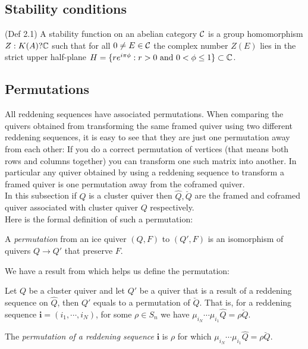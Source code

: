 \subsection{Stability conditions}
\begin{definition}
\cite{B07}(Def 2.1) A stability function on an abelian category $\mathcal{C}$ is a group homomorphism $Z : K(A) ? \mathbb{C}$ such that for all $0\neq E\in\mathcal{C}$ the complex number $Z(E)$ lies in the strict upper half-plane $H = \{re^{i\pi\phi} : r > 0\text{ and }0 < \phi\leq 1\}\subset\mathbb{C}$.
\end{definition}
\subsection{Permutations}
\indent All reddening sequences have associated permutations. When comparing the quivers obtained from transforming the same framed quiver using two different reddening sequences, it is easy to see that they are just one permutation away from each other: If you do a correct permutation of vertices (that means both rows and columns together) you can transform one such matrix into another. In particular any quiver obtained by using a reddening sequence to transform a framed quiver is one permutation away from the coframed quiver.\\
\indent In this subsection if $Q$ is a cluster quiver then $\hat{Q}, \breve{Q}$ are the framed and coframed quiver associated with cluster quiver $Q$ respectively.\\
\indent Here is the formal definition of such a permutation:\\
\begin{definition}
\cite{BDP13} A \textit{permutation} from an ice quiver $(Q,F)$ to $(Q',F)$ is an isomorphism of quivers $Q\rightarrow Q'$ that preserve $F$.\\
\end{definition}
\indent We have a result from \cite{BDP13} which helps us define the permutation:\\
\begin{theorem}
\cite{BDP13} Let $Q$ be a cluster quiver and let $Q'$ be a quiver that is a result of a reddening sequence on $\hat{Q}$, then  $Q'$ equals to a permutation of $\breve{Q}$. That is, for a reddening sequence $\mathbf{i}=(i_1,\cdots, i_N)$, for some $\rho\in S_n$ we have $\mu_{i_N}\cdots\mu_{i_1}\hat{Q}=\rho\breve{Q}$.\\
\end{theorem}
\begin{definition}
\cite{GM14} The \textit{permutation of a reddening sequence} $\mathbf{i}$ is $\rho$ for which $\mu_{i_N}\cdots\mu_{i_1}\hat{Q}=\rho\breve{Q}$.\\
\end{definition}
